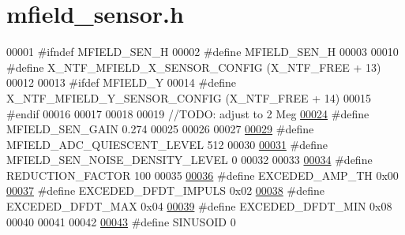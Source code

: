 \hypertarget{a00019_source}{\section{mfield\+\_\+sensor.\+h}
\label{a00019_source}
}

\begin{DoxyCode}
00001 \textcolor{preprocessor}{#ifndef MFIELD\_SEN\_H}
00002 \textcolor{preprocessor}{#define MFIELD\_SEN\_H}
00003 
00010 \textcolor{preprocessor}{#define X\_NTF\_MFIELD\_X\_SENSOR\_CONFIG                                (X\_NTF\_FREE  + 13)}
00012 
00013 \textcolor{preprocessor}{#ifdef MFIELD\_Y}
00014 \textcolor{preprocessor}{#define X\_NTF\_MFIELD\_Y\_SENSOR\_CONFIG                                (X\_NTF\_FREE +  14)}
00015 \textcolor{preprocessor}{#endif}
00016 
00017 
00018 
00019 \textcolor{comment}{//TODO: adjust to 2 Meg}
\hypertarget{a00019_source_l00024}{}\hyperlink{a00019_a0dbceb8ab2804359733a52568f2fd349}{00024} \textcolor{comment}{}\textcolor{preprocessor}{#define MFIELD\_SEN\_GAIN                                             0.274}
00025 
00026 
00027 
\hypertarget{a00019_source_l00029}{}\hyperlink{a00019_a2310c2bd339d54b86e9fae262def2008}{00029} \textcolor{preprocessor}{#define MFIELD\_ADC\_QUIESCENT\_LEVEL                                  512}
00030 
\hypertarget{a00019_source_l00031}{}\hyperlink{a00019_aafdb9e443a3251c41a62e1a1534673f9}{00031} \textcolor{preprocessor}{#define MFIELD\_SEN\_NOISE\_DENSITY\_LEVEL                              0}
00032 
00033 
\hypertarget{a00019_source_l00034}{}\hyperlink{a00019_a9c3f9296b977b6f4f9632c8430525738}{00034} \textcolor{preprocessor}{#define REDUCTION\_FACTOR          100}
00035 
\hypertarget{a00019_source_l00036}{}\hyperlink{a00019_a9c5372190518a7d696da393f1a9a5fb9}{00036} \textcolor{preprocessor}{#define EXCEDED\_AMP\_TH            0x00}
\hypertarget{a00019_source_l00037}{}\hyperlink{a00019_abf943c473e214930a7be647c4c43b55d}{00037} \textcolor{preprocessor}{#define EXCEDED\_DFDT\_IMPULS       0x02}
\hypertarget{a00019_source_l00038}{}\hyperlink{a00019_afe7d875f6e5291e2b91df5c18af8789f}{00038} \textcolor{preprocessor}{#define EXCEDED\_DFDT\_MAX          0x04}
\hypertarget{a00019_source_l00039}{}\hyperlink{a00019_a7bccfba89f8c2aedefd2d67e2a1c475e}{00039} \textcolor{preprocessor}{#define EXCEDED\_DFDT\_MIN          0x08}
00040 
00041 
00042 
\hypertarget{a00019_source_l00043}{}\hyperlink{a00019_a8956b2c85796334b2f0617ebd3cf9a52}{00043} \textcolor{preprocessor}{#define SINUSOID                               0}

\end{DoxyCode}
